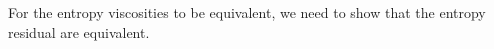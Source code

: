 \documentclass[review]{elsarticle}
\newcommand{\eqts}[1]{Eqs.~(\ref{#1})}                     %
\newcommand{\sect}[1]{Section~\ref{#1}}                     %
\begin{document}
\begin{appendices}
For the entropy viscosities to be equivalent, we need to show that the entropy residual are equivalent.

 
%
%

\end{appendices}
\end{document}

